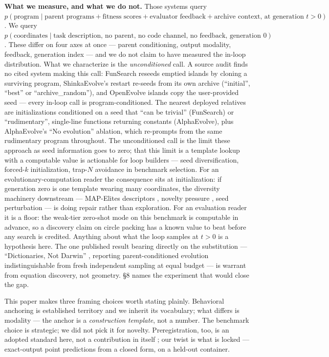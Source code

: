 \textbf{What we measure, and what we do not.} Those systems query $p(\text{program} \mid \text{parent programs} +
\text{fitness scores} + \text{evaluator feedback} + \text{archive context, at generation } t > 0)$. We query
$p(\text{coordinates} \mid \text{task description, no parent, no code channel, no feedback, generation 0})$. These
differ on four axes at once --- parent conditioning, output modality, feedback, generation index
--- and we do not claim to have measured the in-loop distribution. What we characterize is the
\emph{unconditioned} call. A source audit finds no cited system making this call: FunSearch reseeds emptied islands by cloning a surviving program,
ShinkaEvolve's restart re-seeds from its own archive (``initial'', ``best'' or
``archive\_random''), and OpenEvolve islands copy the user-provided seed --- every in-loop call is
program-conditioned. The nearest deployed relatives are initializations conditioned on a seed
that ``can be trivial'' (FunSearch) or ``rudimentary'', single-line functions returning constants
(AlphaEvolve), plus AlphaEvolve's ``No evolution'' ablation, which re-prompts from the same
rudimentary program throughout. The unconditioned call is the limit these approach as
seed information goes to zero; that this limit is a template lookup with a computable value
is actionable for loop builders --- seed
diversification, forced-$k$ initialization, trap-$N$ avoidance in benchmark selection. For an evolutionary-computation reader the consequence sits at initialization: if generation zero is one template wearing many coordinates, the diversity machinery downstream --- MAP-Elites descriptors \citep{mouret2015mapelites}, novelty pressure \citep{lehman2011novelty}, seed perturbation --- is doing repair rather than exploration. For an evaluation reader it is a floor: the weak-tier zero-shot mode on this benchmark is computable in advance, so a discovery claim on circle packing has a known value to beat before any search is credited. Anything about what the loop samples at $t > 0$ is a
hypothesis here. The one published result bearing directly on the substitution ---
``Dictionaries, Not Darwin'' \citep{li2026dictionariesdarwinsetlevelselection}, reporting parent-conditioned evolution
indistinguishable from fresh independent sampling at equal budget --- is warrant from equation
discovery, not geometry. \S8 names the experiment that would close the gap.

This paper makes three framing choices worth stating plainly. Behavioral anchoring is
established territory \citep{huang2026understandinganchoringeffectllm,lou2024anchoringbiaslargelanguage,malberg2025comprehensiveevaluationcognitivebiases} and we inherit its vocabulary; what
differs is modality --- the anchor is a \emph{construction template}, not a number. The benchmark
choice is strategic; we did not pick it for novelty. Preregistration, too, is an adopted
standard here, not a contribution in itself \citep{thomas2026mitigatingllmbasedphackingpreregistering,williams2026predictingllmsafetyrelease,vaccaro2026preregistrationexperimentsaiagents,zhang2026testingfrontierlargelanguage};
our twist is what is locked --- exact-output point predictions from a closed form, on a held-out
container.

